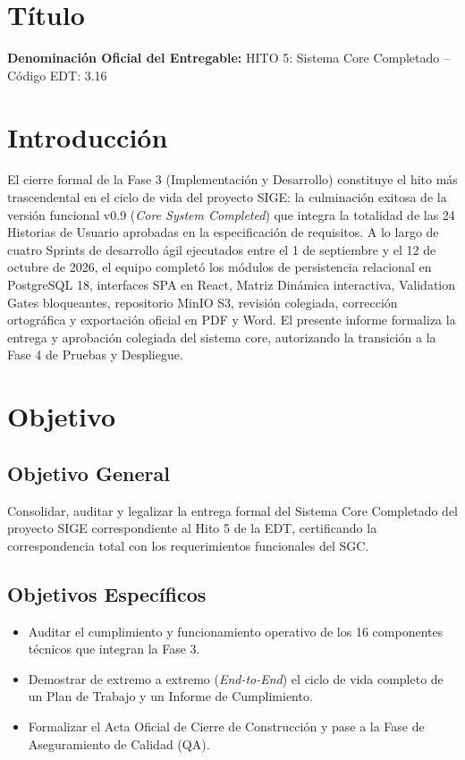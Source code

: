 \documentclass[12pt,a4paper]{article}
\begin{document}
\section{Título}
\textbf{Denominación Oficial del Entregable:} HITO 5: Sistema Core Completado -- Código EDT: 3.16

\section{Introducción}
El cierre formal de la Fase 3 (Implementación y Desarrollo) constituye el hito más trascendental en el ciclo de vida del proyecto SIGE: la culminación exitosa de la versión funcional v0.9 (\textit{Core System Completed}) que integra la totalidad de las 24 Historias de Usuario aprobadas en la especificación de requisitos. A lo largo de cuatro Sprints de desarrollo ágil ejecutados entre el 1 de septiembre y el 12 de octubre de 2026, el equipo completó los módulos de persistencia relacional en PostgreSQL 18, interfaces SPA en React, Matriz Dinámica interactiva, Validation Gates bloqueantes, repositorio MinIO S3, revisión colegiada, corrección ortográfica y exportación oficial en PDF y Word. El presente informe formaliza la entrega y aprobación colegiada del sistema core, autorizando la transición a la Fase 4 de Pruebas y Despliegue.

\section{Objetivo}
\subsection{Objetivo General}
Consolidar, auditar y legalizar la entrega formal del Sistema Core Completado del proyecto SIGE correspondiente al Hito 5 de la EDT, certificando la correspondencia total con los requerimientos funcionales del SGC.
\subsection{Objetivos Específicos}
\begin{itemize}[leftmargin=1.5em, itemsep=2pt]
    \item Auditar el cumplimiento y funcionamiento operativo de los 16 componentes técnicos que integran la Fase 3.
    \item Demostrar de extremo a extremo (\textit{End-to-End}) el ciclo de vida completo de un Plan de Trabajo y un Informe de Cumplimiento.
    \item Formalizar el Acta Oficial de Cierre de Construcción y pase a la Fase de Aseguramiento de Calidad (QA).
\end{itemize}
\end{document}
